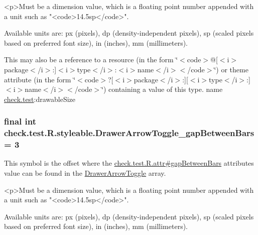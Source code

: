 \begin{DoxyVerb}      <p>Must be a dimension value, which is a floating point number appended with a unit such as "<code>14.5sp</code>".
\end{DoxyVerb}
 Available units are\+: px (pixels), dp (density-\/independent pixels), sp (scaled pixels based on preferred font size), in (inches), mm (millimeters). 

This may also be a reference to a resource (in the form \char`\"{}$<$code$>$@\mbox{[}$<$i$>$package$<$/i$>$\+:\mbox{]}$<$i$>$type$<$/i$>$\+:$<$i$>$name$<$/i$>$$<$/code$>$\char`\"{}) or theme attribute (in the form \char`\"{}$<$code$>$?\mbox{[}$<$i$>$package$<$/i$>$\+:\mbox{]}\mbox{[}$<$i$>$type$<$/i$>$\+:\mbox{]}$<$i$>$name$<$/i$>$$<$/code$>$\char`\"{}) containing a value of this type.  name \hyperlink{namespacecheck_1_1test}{check.\+test}\+:drawable\+Size \hypertarget{classcheck_1_1test_1_1_r_1_1styleable_a44d301c2d203c5db285393f8159327c4}{}
\subsubsection[{Drawer\+Arrow\+Toggle\+\_\+gap\+Between\+Bars}]{\setlength{\rightskip}{0pt plus 5cm}final int check.\+test.\+R.\+styleable.\+Drawer\+Arrow\+Toggle\+\_\+gap\+Between\+Bars = 3\hspace{0.3cm}{\ttfamily [static]}}\label{classcheck_1_1test_1_1_r_1_1styleable_a44d301c2d203c5db285393f8159327c4}
This symbol is the offset where the \hyperlink{classcheck_1_1test_1_1_r_1_1attr_ad145c34b60189d9c7ef95b0b8169ebcb}{check.\+test.\+R.\+attr\#gap\+Between\+Bars} attribute\textquotesingle{}s value can be found in the \hyperlink{classcheck_1_1test_1_1_r_1_1styleable_a3bd2348d01049d5d42d5b7f277abeec9}{Drawer\+Arrow\+Toggle} array.

\begin{DoxyVerb}      <p>Must be a dimension value, which is a floating point number appended with a unit such as "<code>14.5sp</code>".
\end{DoxyVerb}
 Available units are\+: px (pixels), dp (density-\/independent pixels), sp (scaled pixels based on preferred font size), in (inches), mm (millimeters). 

